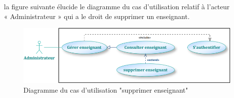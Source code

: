 \documentclass[12 pt ]{report}
\begin{document}
la figure suivante élucide le diagramme du cas d’utilisation  relatif à l’acteur \\« Administrateur » qui a le droit de supprimer un enseignant.
\begin{figure}[h]
 \begin{center}
\includegraphics[width=13 cm ,height= 4 cm]{a8.PNG}
\caption{Diagramme du cas d’utilisation "supprimer enseignant"}
\end{center}
\end{figure}
\end{document}
